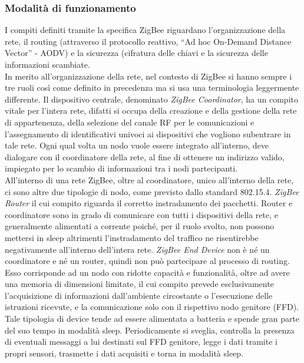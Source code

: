 \subsubsection{Modalità di funzionamento}
I compiti definiti tramite la specifica ZigBee riguardano l'organizzazione della rete, il routing (attraverso il protocollo reattivo, ``Ad hoc On-Demand Distance Vector'' - AODV) e la sicurezza (cifratura delle chiavi e la sicurezza delle informazioni scambiate.\\
In merito all'organizzazione della rete, nel contesto di ZigBee si hanno sempre i tre ruoli così come definito in precedenza ma si usa una terminologia leggermente differente.
Il dispositivo centrale, denominato \textit{ZigBee Coordinator}, ha un compito vitale per l'intera rete, difatti si occupa della creazione e della gestione della rete di appartenenza, della selezione del canale RF per le comunicazioni e l'assegnamento di identificativi univoci ai dispositivi che vogliono subentrare in tale rete. Ogni qual volta un nodo vuole essere integrato all'interno, deve dialogare con il coordinatore della rete, al fine di ottenere un indirizzo valido, impiegato per lo scambio di informazioni tra i nodi partecipanti.\\
All'interno di una rete ZigBee, oltre al coordinatore, unico all'interno della rete, ci sono altre due tipologie di nodo, come previsto dallo standard 802.15.4. 
\textit{ZigBee Router} il cui compito riguarda il corretto instradamento dei pacchetti. Router e coordinatore sono in grado di comunicare con tutti i dispositivi della rete, e generalmente alimentati a corrente poiché, per il ruolo svolto, non possono mettersi in sleep altrimenti l'instradamento del traffico ne risentirebbe negativamente all'interno dell'intera rete.
\textit{ZigBee End Device} non è né un coordinatore e né un router, quindi non può partecipare al processo di routing. Esso corrisponde ad un nodo con ridotte capacità e funzionalità, oltre ad avere una memoria di dimensioni limitate, il cui compito prevede esclusivamente l'acquisizione di informazioni dall'ambiente circostante o l'esecuzione delle istruzioni ricevute, e la comunicazione solo con il rispettivo nodo genitore (FFD). Tale tipologia di device tende ad essere alimentata a batteria e spende gran parte del suo tempo in modalità sleep. Periodicamente si sveglia, controlla la presenza di eventuali messaggi a lui destinati sul FFD genitore, legge i dati tramite i propri sensori, trasmette i dati acquisiti e torna in modalità sleep.\\


